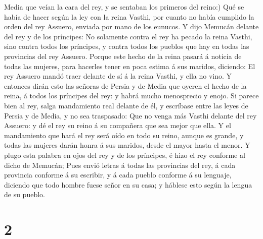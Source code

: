 Media que veían la cara del rey, y se sentaban los primeros del reino:)
 Qué se había de hacer según la ley con la reina Vasthi,
por cuanto no había cumplido la orden del rey Assuero, enviada por mano
de los eunucos.  Y dijo Memucán delante del rey y de los
príncipes: No solamente contra el rey ha pecado la reina Vasthi, sino
contra todos los príncipes, y contra todos los pueblos que hay en todas
las provincias del rey Assuero.  Porque este hecho de la
reina pasará á noticia de todas las mujeres, para hacerles tener en poca
estima á sus maridos, diciendo: El rey Assuero mandó traer delante de sí
á la reina Vasthi, y ella no vino.  Y entonces dirán esto
las señoras de Persia y de Media que oyeren el hecho de la reina, á
todos los príncipes del rey: y habrá mucho menosprecio y enojo.
 Si parece bien al rey, salga mandamiento real delante de
él, y escríbase entre las leyes de Persia y de Media, y no sea
traspasado: Que no venga más Vasthi delante del rey Assuero: y dé el rey
su reino á su compañera que sea mejor que ella.  Y el
mandamiento que hará el rey será oído en todo su reino, aunque es
grande, y todas las mujeres darán honra á sus maridos, desde el mayor
hasta el menor.  Y plugo esta palabra en ojos del rey y
de los príncipes, é hizo el rey conforme al dicho de Memucán;
 Pues envió letras á todas las provincias del rey, á cada
provincia conforme á su escribir, y á cada pueblo conforme á su
lenguaje, diciendo que todo hombre fuese señor en su casa; y háblese
esto según la lengua de su pueblo.

\hypertarget{section-1}{%
\section{2}\label{section-1}}


